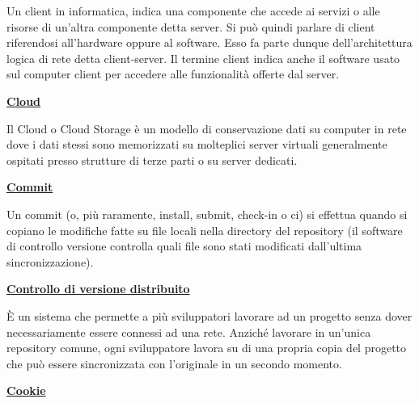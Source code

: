\medskip
\begin{addmargin}[5em]{1em}
	Un client in informatica, indica una componente che accede ai servizi o alle risorse di un'altra componente detta server. Si può quindi parlare di client riferendosi all'hardware oppure al software. Esso fa parte dunque dell'architettura logica di rete detta client-server.
Il termine client indica anche il software usato sul computer client per accedere alle funzionalità offerte dal server.	
\end{addmargin}		

\bigskip
\begin{addmargin}[0em]{0em}
	\textbf{\underline{Cloud}}
\end{addmargin}
	
\medskip
	\begin{addmargin}[5em]{1em}
Il Cloud o Cloud Storage è un modello di conservazione dati su computer in rete dove i dati stessi sono memorizzati su molteplici server virtuali generalmente ospitati presso strutture di terze parti o su server dedicati.	
\end{addmargin}	

\bigskip
\begin{addmargin}[0em]{0em}	
	\textbf{\underline{Commit}}
\end{addmargin}

\medskip
\begin{addmargin}[5em]{1em}	
Un commit (o, più raramente, install, submit, check-in o ci) si effettua quando si copiano le modifiche fatte su file locali nella directory del repository (il software di controllo versione controlla quali file sono stati modificati dall'ultima sincronizzazione).
\end{addmargin}

\bigskip
\begin{addmargin}[0em]{0em}
	\textbf{\underline{Controllo di versione distribuito}}
\end{addmargin}

\medskip
\begin{addmargin}[5em]{1em}	
È un sistema che permette a più sviluppatori lavorare ad un progetto senza dover necessariamente essere connessi ad una rete. Anziché lavorare in un'unica repository comune, ogni sviluppatore lavora su di una propria copia del progetto che può essere sincronizzata con l'originale in un secondo momento.
\end{addmargin}

\bigskip
\begin{addmargin}[0em]{0em}	
	\textbf{\underline{Cookie}}
\end{addmargin}
	
